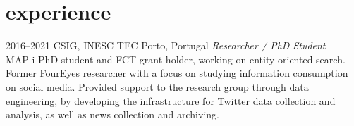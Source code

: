 \documentclass{friggeri-cv}
\begin{document}

\section{experience}

\begin{entrylist}
\entry
{2016--2021}
{CSIG, INESC TEC}
{Porto, Portugal}
{\emph{Researcher / PhD Student}\\
MAP-i PhD student and FCT grant holder, working on entity-oriented search. Former FourEyes researcher with a focus on studying information consumption on social media. Provided support to the research group through data engineering, by developing the infrastructure for Twitter data collection and analysis, as well as news collection and archiving.}
\end{entrylist}
\end{document}
